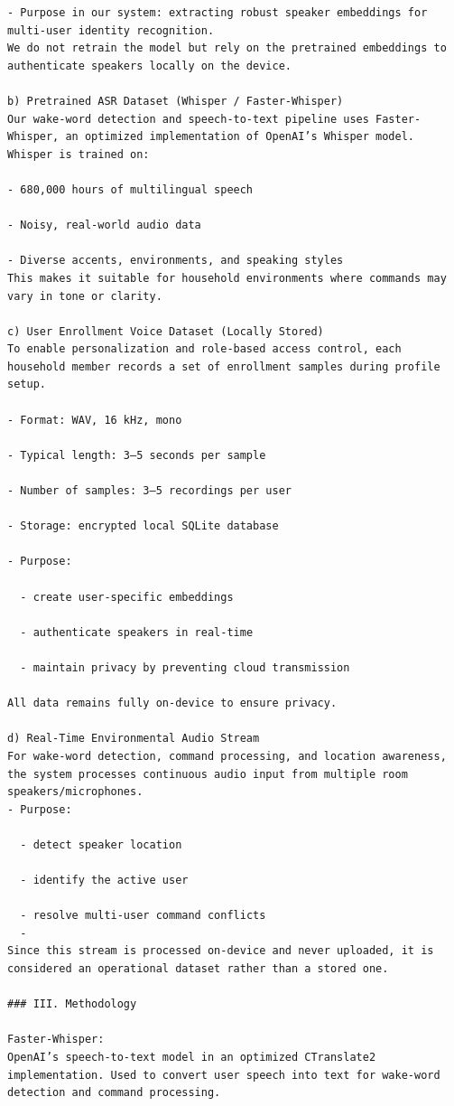 \documentclass[conference]{IEEEtran}
\begin{document}
\begin{lstlisting}
- Purpose in our system: extracting robust speaker embeddings for multi-user identity recognition.
We do not retrain the model but rely on the pretrained embeddings to authenticate speakers locally on the device.

b) Pretrained ASR Dataset (Whisper / Faster-Whisper)
Our wake-word detection and speech-to-text pipeline uses Faster-Whisper, an optimized implementation of OpenAI’s Whisper model. Whisper is trained on:

- 680,000 hours of multilingual speech

- Noisy, real-world audio data

- Diverse accents, environments, and speaking styles
This makes it suitable for household environments where commands may vary in tone or clarity.

c) User Enrollment Voice Dataset (Locally Stored)
To enable personalization and role-based access control, each household member records a set of enrollment samples during profile setup.

- Format: WAV, 16 kHz, mono

- Typical length: 3–5 seconds per sample

- Number of samples: 3–5 recordings per user

- Storage: encrypted local SQLite database

- Purpose:

  - create user-specific embeddings

  - authenticate speakers in real-time

  - maintain privacy by preventing cloud transmission
    
All data remains fully on-device to ensure privacy.

d) Real-Time Environmental Audio Stream
For wake-word detection, command processing, and location awareness, the system processes continuous audio input from multiple room speakers/microphones.
- Purpose:

  - detect speaker location

  - identify the active user

  - resolve multi-user command conflicts
  - 
Since this stream is processed on-device and never uploaded, it is considered an operational dataset rather than a stored one.

### III. Methodology 

Faster-Whisper:
OpenAI’s speech-to-text model in an optimized CTranslate2 implementation. Used to convert user speech into text for wake-word detection and command processing.


\end{lstlisting}
\end{document}
